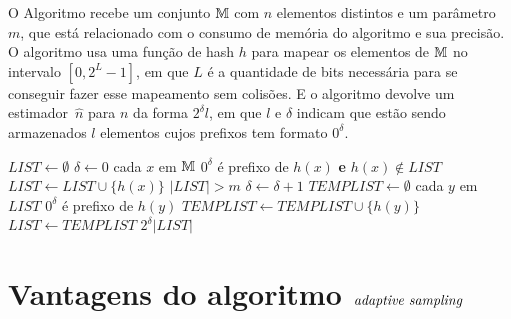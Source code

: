 O Algoritmo  recebe um conjunto $\mathbb{M}$ com $n$ elementos distintos e um parâmetro $m$, que está 
relacionado com o consumo de memória do algoritmo e sua precisão. O algoritmo usa uma função de hash $h$ para mapear os 
elementos de $\mathbb{M}$ no intervalo $[0, 2^L - 1]$, em que $L$ é a quantidade de bits necessária para se conseguir fazer 
esse mapeamento sem colisões. E o algoritmo devolve um estimador~$\hat{n}$ para $n$ da forma $2^{\delta} l$, em que $l$ 
e $\delta$ indicam que estão sendo armazenados $l$ elementos cujos prefixos tem formato $0^{\delta}$.

\begin{codebox}
  \li $LIST \gets \emptyset$
  \li $\delta \gets 0$
  \li \For cada $x$ em $\mathbb{M}$ 
  \li    \Do 
         \If $0^{\delta}$ é prefixo de $h(x)$ \textbf{e} $h(x) \not\in LIST$
  \li             \Then $LIST \gets LIST \cup \{ h(x) \}$
         \End
  \li    \While $|LIST| > m$
  \li    \Do
         $\delta \gets \delta + 1$
  \li    $TEMPLIST \gets \emptyset$
  \li    \For cada $y$ em $LIST$
  \li    \Do
            \If $0^{\delta}$ é prefixo de $h(y)$
  \li       \Then $TEMPLIST \gets TEMPLIST \cup \{ h(y) \}$
            \End
         \End
  \li    $LIST \gets TEMPLIST$
         \End 
      \End
  \li
  \Return $2^{\delta} |LIST|$   
  \End
\end{codebox}


\section{Vantagens do algoritmo $\textit{adaptive sampling}$}
\label{lab:chapter:04:02}

